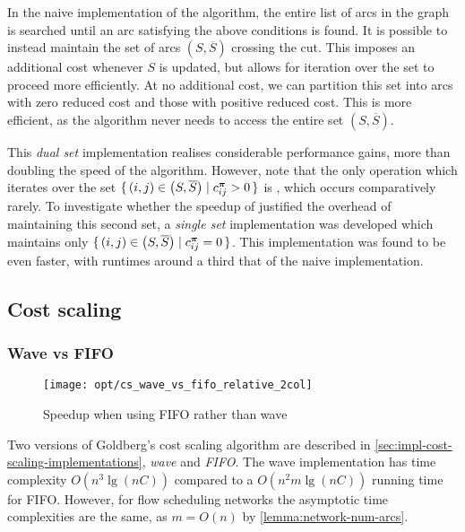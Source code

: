 In the naive implementation of the algorithm, the entire list of arcs in the graph is searched until an arc satisfying the above conditions is found. It is possible to instead maintain the set of arcs $\left(S,\overline{S}\right)$ crossing the cut. This imposes an additional cost whenever $S$ is updated, but allows for iteration over the set to proceed more efficiently. At no additional cost, we can partition this set into arcs with zero reduced cost and those with positive reduced cost\footnotemark. This is more efficient, as the algorithm never needs to access the entire set $\left(S,\overline{S}\right)$.

This \emph{dual set} implementation realises considerable performance gains, more than doubling the speed of the algorithm. However, note that the only operation which iterates over the set $\set{(i,j) \in \left(S,\overline{S}\right) | c_{ij}^{\boldsymbol{\pi}} > 0}$ is , which occurs comparatively rarely. To investigate whether the speedup of  justified the overhead of maintaining this second set, a \emph{single set} implementation was developed which maintains only $\set{(i,j) \in \left(S,\overline{S}\right) | c_{ij}^{\boldsymbol{\pi}} = 0}$. This implementation was found to be even faster, with runtimes around a third that of the naive implementation.

\subsection{Cost scaling}

\subsubsection{Wave vs FIFO}

\begin{figure}
    \centering
    \texttt{[image: opt/cs\_wave\_vs\_fifo\_relative\_2col]}
    \caption{Speedup when using FIFO rather than wave}
    \label{fig:opt-cs-wave-vs-fifo}
\end{figure}

Two versions of Goldberg's cost scaling algorithm are described in \cref{sec:impl-cost-scaling-implementations}, \emph{wave} and \emph{FIFO}. The wave implementation has time complexity $O\left(n^3 \lg \left(nC\right)\right)$ compared to a $O\left(n^2m\lg\left(nC\right)\right)$ running time for FIFO. However, for flow scheduling networks the asymptotic time complexities are the same, as $m = O(n)$ by \cref{lemma:network-num-arcs}. 

